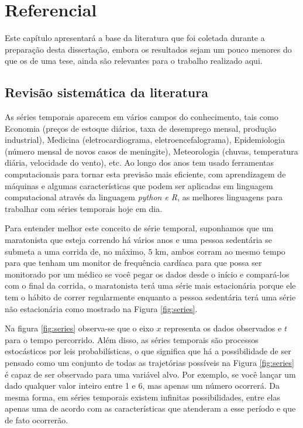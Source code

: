 \section{Referencial}\label{sec:refteo}


Este capítulo apresentará a base da literatura que foi coletada durante a preparação desta dissertação, embora os resultados sejam um pouco menores do que os de uma tese, ainda são relevantes para o trabalho realizado aqui.


    

\subsection{Revis\~ao sistem\'atica da literatura} \label{subsec:revisão}

As séries temporais aparecem em vários campos do conhecimento, tais como Economia (preços de estoque diários, taxa de desemprego mensal, produção industrial), Medicina (eletrocardiograma, eletroencefalograma), Epidemiologia (número mensal de novos casos de meningite), Meteorologia (chuvas, temperatura diária, velocidade do vento), etc. Ao longo dos anos tem usado ferramentas computacionais para tornar esta previsão mais eficiente, com aprendizagem de máquinas e algumas características que podem ser aplicadas em linguagem computacional através da linguagem \textit{python e R}, as melhores linguagens para trabalhar com séries temporais hoje em dia.

Para entender melhor este conceito de série temporal, suponhamos que um maratonista que esteja correndo há vários anos e uma pessoa sedentária se submeta a uma corrida de, no máximo, $5$ km, ambos corram ao mesmo tempo para que tenham um monitor de frequência cardíaca para que possa ser monitorado por um médico se você pegar os dados desde o início e compará-los com o final da corrida, o maratonista terá uma série mais estacionária porque ele tem o hábito de correr regularmente enquanto a pessoa sedentária terá uma série não estacionária como mostrado na Figura \ref{fig:series}.




Na figura \ref{fig:series} observa-se que o eixo $x$ representa os dados observados e $t$ para o tempo percorrido.
Além disso, as séries temporais são processos estocásticos por leis probabilísticas, o que significa que há a possibilidade de ser pensado como um conjunto de todas as trajetórias possíveis na Figura \ref{fig:series} é capaz de ser observado para uma variável alvo. Por exemplo, se você lançar um dado qualquer valor inteiro entre 1 e 6, mas apenas um número ocorrerá. Da mesma forma, em séries temporais existem infinitas possibilidades, entre elas apenas uma de acordo com as características que atenderam a esse período e que de fato ocorrerão.


